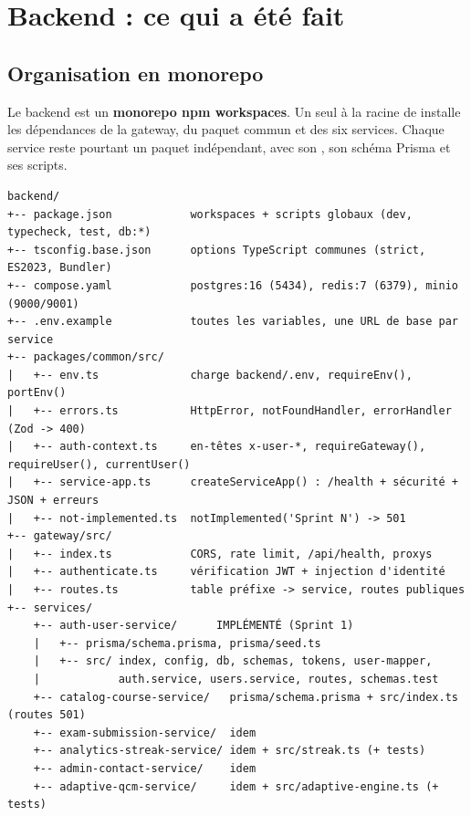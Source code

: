 \section{Backend : ce qui a été fait}

\subsection{Organisation en monorepo}

Le backend est un \textbf{monorepo npm workspaces}. Un seul  à la racine de  installe les dépendances de la gateway, du paquet commun et des six services. Chaque service reste pourtant un paquet indépendant, avec son , son schéma Prisma et ses scripts.

\begin{lstlisting}[numbers=none,language={},caption={Arborescence du backend (1\,336 lignes de TypeScript et Prisma écrites à la main)}]
backend/
+-- package.json            workspaces + scripts globaux (dev, typecheck, test, db:*)
+-- tsconfig.base.json      options TypeScript communes (strict, ES2023, Bundler)
+-- compose.yaml            postgres:16 (5434), redis:7 (6379), minio (9000/9001)
+-- .env.example            toutes les variables, une URL de base par service
+-- packages/common/src/
|   +-- env.ts              charge backend/.env, requireEnv(), portEnv()
|   +-- errors.ts           HttpError, notFoundHandler, errorHandler (Zod -> 400)
|   +-- auth-context.ts     en-têtes x-user-*, requireGateway(), requireUser(), currentUser()
|   +-- service-app.ts      createServiceApp() : /health + sécurité + JSON + erreurs
|   +-- not-implemented.ts  notImplemented('Sprint N') -> 501
+-- gateway/src/
|   +-- index.ts            CORS, rate limit, /api/health, proxys
|   +-- authenticate.ts     vérification JWT + injection d'identité
|   +-- routes.ts           table préfixe -> service, routes publiques
+-- services/
    +-- auth-user-service/      IMPLÉMENTÉ (Sprint 1)
    |   +-- prisma/schema.prisma, prisma/seed.ts
    |   +-- src/ index, config, db, schemas, tokens, user-mapper,
    |            auth.service, users.service, routes, schemas.test
    +-- catalog-course-service/   prisma/schema.prisma + src/index.ts (routes 501)
    +-- exam-submission-service/  idem
    +-- analytics-streak-service/ idem + src/streak.ts (+ tests)
    +-- admin-contact-service/    idem
    +-- adaptive-qcm-service/     idem + src/adaptive-engine.ts (+ tests)
\end{lstlisting}

